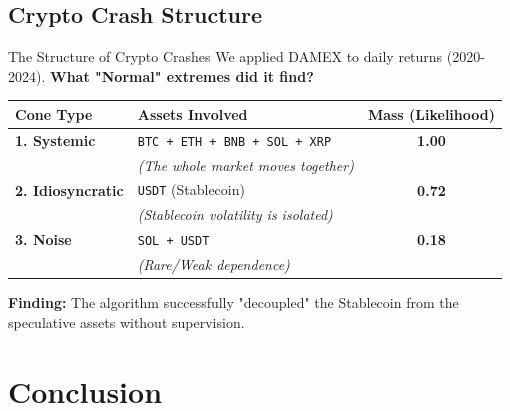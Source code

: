 \documentclass{beamer}
\begin{document}
\subsection{Crypto Crash Structure}
\begin{frame}{The Structure of Crypto Crashes}
    We applied DAMEX to daily returns (2020-2024). 
    \textbf{What "Normal" extremes did it find?}

    \begin{table}[]
        \centering
        \footnotesize
        \begin{tabular}{llc}
            \toprule
            \textbf{Cone Type} & \textbf{Assets Involved} & \textbf{Mass (Likelihood)} \\
            \midrule
            \textbf{1. Systemic} & \texttt{BTC + ETH + BNB + SOL + XRP} & \textbf{1.00} \\
            & \textit{(The whole market moves together)} & \\
            \midrule
            \textbf{2. Idiosyncratic} & \texttt{USDT} (Stablecoin) & \textbf{0.72} \\
            & \textit{(Stablecoin volatility is isolated)} & \\
            \midrule
            \textbf{3. Noise} & \texttt{SOL + USDT} & \textbf{0.18} \\
            & \textit{(Rare/Weak dependence)} & \\
            \bottomrule
        \end{tabular}
    \end{table}

    \textbf{Finding:} The algorithm successfully "decoupled" the Stablecoin from the speculative assets without supervision.
\end{frame}

\section{Conclusion}
\end{document}
